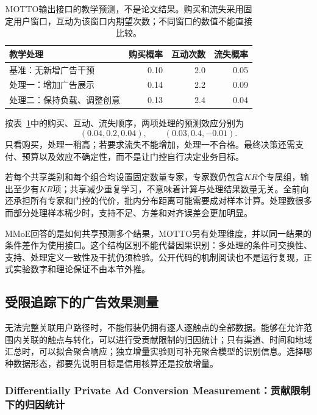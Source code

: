 \begin{table}[htbp]
  \centering
  \begin{tabularx}{\linewidth}{@{}Xrrr@{}}
    \toprule
    教学处理 & 购买概率 & 互动次数 & 流失概率\\
    \midrule
    基准：无新增广告干预 & 0.10 & 2.0 & 0.05\\
    处理一：增加广告展示 & 0.14 & 2.2 & 0.09\\
    处理二：保持负载、调整创意 & 0.13 & 2.4 & 0.04\\
    \bottomrule
  \end{tabularx}
  \caption{MOTTO输出接口的教学预测，不是论文结果。购买和流失采用固定用户窗口，互动为该窗口内期望次数；不同窗口的数值不能直接比较。}
  \label{tab:rs-advertising-motto}
\end{table}

按表~\ref{tab:rs-advertising-motto}中的购买、互动、流失顺序，两项处理的预测效应分别为
\[
  (0.04,0.2,0.04),\qquad (0.03,0.4,-0.01).
\]
只看购买，处理一稍高；若要求流失不能增加，处理一不合格。最终决策还需支付、预算以及效应不确定性，而不是让门控自行决定业务目标。

若每个共享类别和每个组合均设置固定数量专家，专家数仍包含$KR$个专属组，输出至少有$KR$项；共享减少重复学习，不意味着计算与处理结果数量无关。全前向还承担所有专家和门控的代价，批内分布距离可能需要成对样本计算。处理数很多而部分处理样本稀少时，支持不足、方差和对齐误差会更加明显。

MMoE回答的是如何共享预测多个结果，MOTTO另有处理维度，并以同一结果的条件差作为使用接口。这个结构区别不能代替因果识别：多处理的条件可交换性、支持、处理定义一致性及干扰仍须检验。公开代码的机制阅读也不是运行复现，正式实验数字和理论保证不由本节外推。

\subsection{受限追踪下的广告效果测量}
\label{sec:rs-advertising-limited-tracking}

无法完整关联用户路径时，不能假装仍拥有逐人逐触点的全部数据。能够在允许范围内关联的触点与转化，可以进行受贡献限制的归因统计；只有渠道、时间和地域汇总时，可以拟合聚合响应；独立增量实验则可补充聚合模型的识别信息。选择哪种数据形态，都要先说明目标是信用核算还是投放增量。

\subsubsection{Differentially Private Ad Conversion Measurement：贡献限制下的归因统计}
\label{sec:rs-advertising-dp-measurement}

